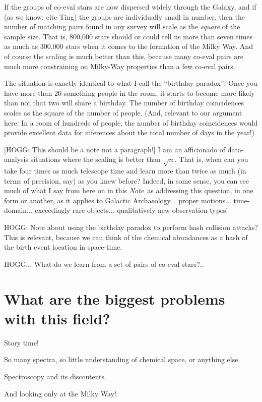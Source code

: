 \documentclass[11pt, letterpaper]{article}
\newcommand{\documentname}{\textsl{Note}}
\begin{document}
If the groups of co-eval stars are now dispersed widely through the
Galaxy, and if (as we know; cite Ting) the groups are individually
small in number, then the number of matching pairs found in any survey
will scale as the \emph{square} of the sample size. That is, 800,000
stars should or could tell us more than seven times as much as 300,000
stars when it comes to the formation of the Milky Way. And of course
the scaling is much better than this, because many co-eval pairs are
much more constraining on Milky-Way properties than a few co-eval
pairs.

The situation is exactly identical to what I call the ``birthday
paradox'': Once you have more than 20-something people in the room, it
starts to become more likely than not that two will share a
birthday. The number of birthday coincidences scales as the square of
the number of people. (And, relevant to our argument here: In a room
of hundreds of people, the number of birthday coincidences would
provide excellent data for inferences about the total number of days
in the year!)

[HOGG: This should be a note not a paragraph!]  I am an afficionado of
data-analysis situations where the scaling is better than
$\sqrt{n}$. That is, when can you take four times as much telescope
time and learn more than twice as much (in terms of precision, say) as
you knew before?  Indeed, in some sense, you can see much of what I
say from here on in this \documentname\ as addressing this question,
in one form or another, as it applies to Galactic
Archaeology... proper motions... time-domain... exceedingly rare
objects... qualitatively new observation types!

HOGG: Note about using the birthday paradox to perform hash collision
attacks? This is relevant, because we can think of the chemical
abundances as a hash of the birth event location in space-time.

HOGG... What do we learn from a set of pairs of co-eval stars?..

\section{What are the biggest problems with this field?}

Story time!

So many spectra, so little understanding of chemical space, or anything else.

Spectroscopy and its discontents.

And looking only at the Milky Way!
\end{document}
